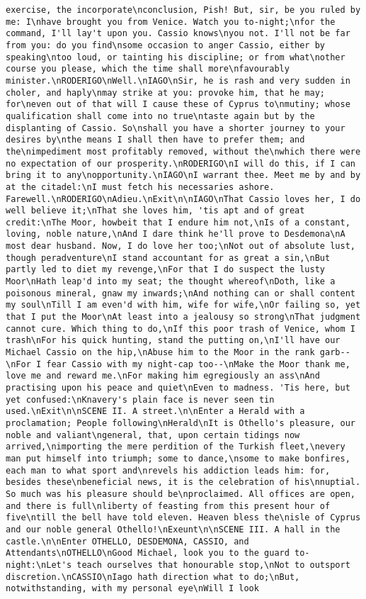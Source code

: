 \begin{verbatim}
exercise, the incorporate\nconclusion, Pish! But, sir, be you ruled by me: I\nhave brought you from Venice. Watch you to-night;\nfor the command, I'll lay't upon you. Cassio knows\nyou not. I'll not be far from you: do you find\nsome occasion to anger Cassio, either by speaking\ntoo loud, or tainting his discipline; or from what\nother course you please, which the time shall more\nfavourably minister.\nRODERIGO\nWell.\nIAGO\nSir, he is rash and very sudden in choler, and haply\nmay strike at you: provoke him, that he may; for\neven out of that will I cause these of Cyprus to\nmutiny; whose qualification shall come into no true\ntaste again but by the displanting of Cassio. So\nshall you have a shorter journey to your desires by\nthe means I shall then have to prefer them; and the\nimpediment most profitably removed, without the\nwhich there were no expectation of our prosperity.\nRODERIGO\nI will do this, if I can bring it to any\nopportunity.\nIAGO\nI warrant thee. Meet me by and by at the citadel:\nI must fetch his necessaries ashore. Farewell.\nRODERIGO\nAdieu.\nExit\n\nIAGO\nThat Cassio loves her, I do well believe it;\nThat she loves him, 'tis apt and of great credit:\nThe Moor, howbeit that I endure him not,\nIs of a constant, loving, noble nature,\nAnd I dare think he'll prove to Desdemona\nA most dear husband. Now, I do love her too;\nNot out of absolute lust, though peradventure\nI stand accountant for as great a sin,\nBut partly led to diet my revenge,\nFor that I do suspect the lusty Moor\nHath leap'd into my seat; the thought whereof\nDoth, like a poisonous mineral, gnaw my inwards;\nAnd nothing can or shall content my soul\nTill I am even'd with him, wife for wife,\nOr failing so, yet that I put the Moor\nAt least into a jealousy so strong\nThat judgment cannot cure. Which thing to do,\nIf this poor trash of Venice, whom I trash\nFor his quick hunting, stand the putting on,\nI'll have our Michael Cassio on the hip,\nAbuse him to the Moor in the rank garb--\nFor I fear Cassio with my night-cap too--\nMake the Moor thank me, love me and reward me.\nFor making him egregiously an ass\nAnd practising upon his peace and quiet\nEven to madness. 'Tis here, but yet confused:\nKnavery's plain face is never seen tin used.\nExit\n\nSCENE II. A street.\n\nEnter a Herald with a proclamation; People following\nHerald\nIt is Othello's pleasure, our noble and valiant\ngeneral, that, upon certain tidings now arrived,\nimporting the mere perdition of the Turkish fleet,\nevery man put himself into triumph; some to dance,\nsome to make bonfires, each man to what sport and\nrevels his addiction leads him: for, besides these\nbeneficial news, it is the celebration of his\nnuptial. So much was his pleasure should be\nproclaimed. All offices are open, and there is full\nliberty of feasting from this present hour of five\ntill the bell have told eleven. Heaven bless the\nisle of Cyprus and our noble general Othello!\nExeunt\n\nSCENE III. A hall in the castle.\n\nEnter OTHELLO, DESDEMONA, CASSIO, and Attendants\nOTHELLO\nGood Michael, look you to the guard to-night:\nLet's teach ourselves that honourable stop,\nNot to outsport discretion.\nCASSIO\nIago hath direction what to do;\nBut, notwithstanding, with my personal eye\nWill I look 
\end{verbatim}
